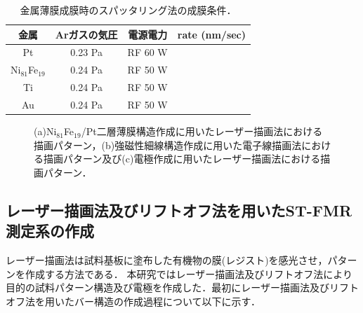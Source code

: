 \begin{table}[htbp]
 \caption{金属薄膜成膜時のスパッタリング法の成膜条件．}
 \begin{center}
  \begin{tabular}{cccc}\toprule
  	金属	&	Arガスの気圧	&	電源電力		&	rate (nm/sec)	\\	\hline
	Pt		&	0.23 Pa			&	RF  60 W		&					\\
	Ni$_{81}$Fe$_{19}$ &	0.24 Pa			&	RF  50 W		&	
	\\
	Ti  &   0.24 Pa   &    RF 50 W   &
	\\
	Au  &  0.24 Pa   &   RF 50 W   &   
						\\	\bottomrule
  \end{tabular}
 \end{center}
 \label{tb:deposite condition}
\end{table}

\begin{figure}[htbp]
 \begin{center}
 \end{center}
 \caption{(a)Ni$_{81}$Fe$_{19}$/Pt二層薄膜構造作成に用いたレーザー描画法における描画パターン，(b)強磁性細線構造作成に用いた電子線描画法における描画パターン及び(c)電極作成に用いたレーザー描画法における描画パターン．
 }
 \label{maskpattern}
\end{figure}





\subsection{レーザー描画法及びリフトオフ法を用いたST-FMR測定系の作成}
レーザー描画法は試料基板に塗布した有機物の膜(レジスト)を感光させ，パターンを作成する方法である．
本研究ではレーザー描画法及びリフトオフ法により目的の試料パターン構造及び電極を作成した．最初にレーザー描画法及びリフトオフ法を用いたバー構造の作成過程について以下に示す．

